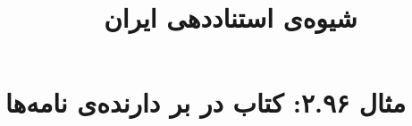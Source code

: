 \documentclass[a4paper,10pt]{article}
\begin{document}
\title{شیوه‌ی استناددهی ایران
 }
\author{}
\date{}
\maketitle



\section*{مثال ۲.۹۶: کتاب در بر دارنده‌ی نامه‌ها}

\cite{فراهانی1358}\\
\cite{adams1930}\\






\end{document}
